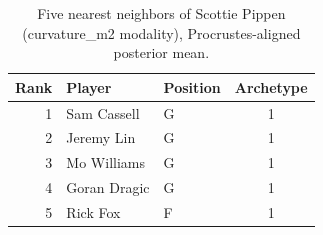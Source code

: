 \begin{table}[htbp]
  \centering\small
  \begin{tabular}{rllc}
    \toprule
    Rank & Player & Position & Archetype \\
    \midrule
    1 & Sam Cassell & G & 1 \\
    2 & Jeremy Lin & G & 1 \\
    3 & Mo Williams & G & 1 \\
    4 & Goran Dragic & G & 1 \\
    5 & Rick Fox & F & 1 \\
    \bottomrule
  \end{tabular}
  \caption{Five nearest neighbors of Scottie Pippen (curvature_m2 modality), Procrustes-aligned posterior mean.}
  \label{tab:Scottie_Pippen_neighbors_curvature_m2}
\end{table}

